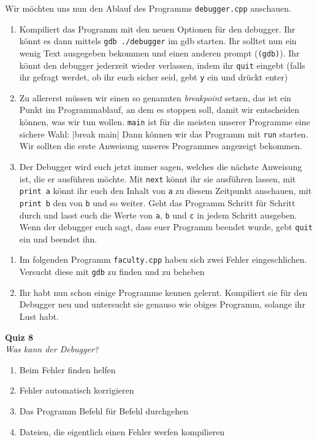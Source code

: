 \newpage

\begin{praxis}

    Wir möchten uns nun den Ablauf des Programms \texttt{debugger.cpp} anschauen.

    \begin{enumerate}
        \item Kompiliert das Programm mit den neuen Optionen für den debugger. Ihr
              könnt es dann mittels \verb|gdb ./debugger| im gdb starten. Ihr solltet
              nun ein wenig Text ausgegeben bekommen und einen anderen prompt
              (\texttt{(gdb)}). Ihr könnt den debugger jederzeit wieder verlassen,
              indem ihr \texttt{quit} eingebt (falls ihr gefragt werdet, ob ihr euch
              sicher seid, gebt \texttt{y} ein und drückt enter)
        \item Zu allererst müssen wir einen so genannten \emph{breakpoint} setzen,
              das ist ein Punkt im Programmablauf, an dem es stoppen soll, damit wir
              entscheiden können, was wir tun wollen. \texttt{main} ist für die
              meisten unserer Programme eine sichere Wahl:
              |break main|
              Dann können wir das Programm mit \texttt{run} starten. Wir sollten die
              erste Anweisung unseres Programmes angezeigt bekommen.
        \item Der Debugger wird euch jetzt immer sagen, welches die nächste
              Anweisung ist, die er ausführen möchte. Mit \texttt{next} könnt ihr sie
              ausführen lassen, mit \texttt{print a} könnt ihr euch den Inhalt von
              \texttt{a} zu diesem Zeitpunkt anschauen, mit \texttt{print b} den von
              \texttt{b} und so weiter. Geht das Programm Schritt für Schritt durch
              und lasst euch die Werte von \texttt{a}, \texttt{b} und \texttt{c} in
              jedem Schritt ausgeben. Wenn der debugger euch sagt, dass euer Programm
              beendet wurde, gebt \texttt{quit} ein und beendet ihn.
    \end{enumerate}
\end{praxis}

\begin{spiel}
\begin{enumerate}
        \item Im folgenden Programm \texttt{faculty.cpp} haben sich zwei Fehler eingeschlichen. Versucht diese mit \texttt{gdb} zu finden und zu beheben
        
        
        \item Ihr habt nun schon einige Programme kennen gelernt. Kompiliert sie
              für den Debugger neu und untersucht sie genauso wie obiges Programm,
              solange ihr Lust habt.
\end{enumerate}
\end{spiel}

\textbf{Quiz 8}\\
\textit{Was kann der Debugger?}
\begin{enumerate}[label=\alph*)]
    \item Beim Fehler finden helfen
    \item Fehler automatisch korrigieren
    \item Das Programm Befehl für Befehl durchgehen
    \item Dateien, die eigentlich einen Fehler werfen kompilieren
\end{enumerate}